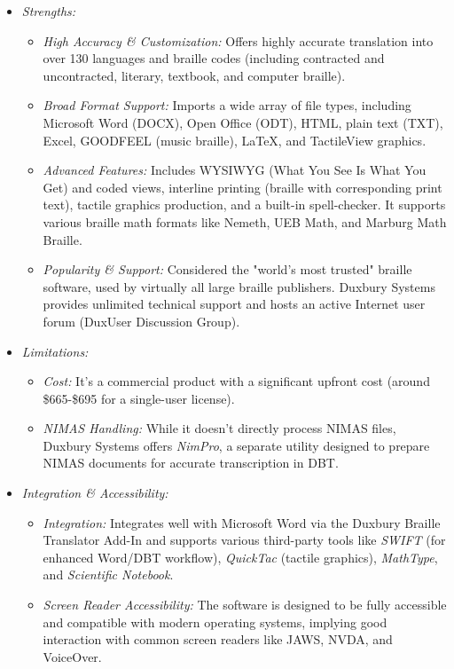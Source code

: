 \begin{itemize}
    \item \emph{Strengths:}
    \begin{itemize}
        \item \emph{High Accuracy \& Customization:} Offers highly accurate translation into over 130 languages and braille codes (including contracted and uncontracted, literary, textbook, and computer braille)\cite{DBTWebsite}.
        \item \emph{Broad Format Support:} Imports a wide array of file types, including Microsoft Word (DOCX), Open Office (ODT), HTML, plain text (TXT), Excel, GOODFEEL (music braille), LaTeX, and TactileView graphics\cite{VisionAidDBT}.
        \item \emph{Advanced Features:} Includes WYSIWYG (What You See Is What You Get) and coded views, interline printing (braille with corresponding print text), tactile graphics production, and a built-in spell-checker. It supports various braille math formats like Nemeth, UEB Math, and Marburg Math Braille\cite{DuxburySystems}.
        \item \emph{Popularity \& Support:} Considered the "world's most trusted" braille software, used by virtually all large braille publishers\cite{DuxburySystems}. Duxbury Systems provides unlimited technical support and hosts an active Internet user forum (DuxUser Discussion Group).
    \end{itemize}
    \item \emph{Limitations:}
    \begin{itemize}
        \item \emph{Cost:} It's a commercial product with a significant upfront cost (around \$665-\$695 for a single-user license)\cite{BlindHelpDBT}.
        \item \emph{NIMAS Handling:} While it doesn't directly process NIMAS files, Duxbury Systems offers \emph{NimPro}, a separate utility designed to prepare NIMAS documents for accurate transcription in DBT\cite{DuxburyProducts}.
    \end{itemize}
    \item \emph{Integration \& Accessibility:}
    \begin{itemize}
        \item \emph{Integration:} Integrates well with Microsoft Word via the Duxbury Braille Translator Add-In and supports various third-party tools like \emph{SWIFT} (for enhanced Word/DBT workflow), \emph{QuickTac} (tactile graphics), \emph{MathType}, and \emph{Scientific Notebook}.
        \item \emph{Screen Reader Accessibility:} The software is designed to be fully accessible and compatible with modern operating systems, implying good interaction with common screen readers like JAWS, NVDA, and VoiceOver.
    \end{itemize}
\end{itemize}

